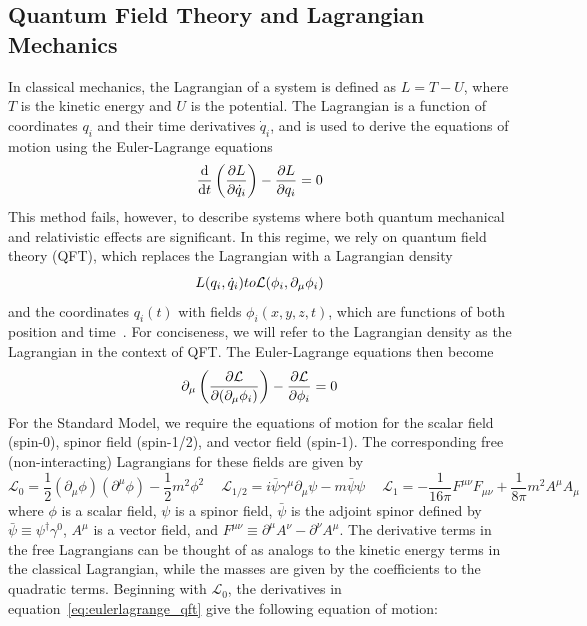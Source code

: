\subsection{Quantum Field Theory and Lagrangian Mechanics} \label{sec:sm_theory_qft}
In classical mechanics, the Lagrangian of a system is defined as $L=T-U$, where $T$ is the kinetic energy and $U$ is the potential. The Lagrangian is a function of coordinates $q_i$ and their time derivatives $\dot{q}_i$, and is used to derive the equations of motion using the Euler-Lagrange equations
\begin{equation}
	\label{eq:eulerlagrange_cm}
	\dv{}{t}\left(\pdv{L}{\dot{q}_i}\right)-\pdv{L}{q_i}=0
\end{equation}
This method fails, however, to describe systems where both quantum mechanical and relativistic effects are significant. In this regime, we rely on quantum field theory (QFT), which replaces the Lagrangian with a Lagrangian density
\begin{equation}
		L(q_i,\dot{q}_i)\to\mathcal{L}(\phi_i,\partial_\mu\phi_i)\\
\end{equation}
and the coordinates $q_i(t)$ with fields $\phi_i(x,y,z,t)$, which are functions of both position and time~\cite{Thomson_2013}. For conciseness, we will refer to the Lagrangian density as the Lagrangian in the context of QFT. The Euler-Lagrange equations then become
\begin{equation}
	\label{eq:eulerlagrange_qft}
	\partial_\mu\left(\pdv{\mathcal{L}}{(\partial_\mu\phi_i)}\right)-\pdv{\mathcal{L}}{\phi_i}=0
\end{equation}
For the Standard Model, we require the equations of motion for the scalar field (spin-0), spinor field (spin-1/2), and vector field (spin-1). The corresponding free (non-interacting) Lagrangians for these fields are given by
\begin{equation}\label{eq:lagrangians}
	\mathcal{L}_0=\frac{1}{2}\left(\partial_\mu\phi\right)\left(\partial^\mu\phi\right)-\frac{1}{2}m^2\phi^2\quad \ 
	\mathcal{L}_{1/2}=i\bar{\psi}\gamma^\mu\partial_\mu\psi-m\bar{\psi}\psi \quad \ 
	\mathcal{L}_{1}=-\frac{1}{16\pi}F^{\mu\nu}F_{\mu\nu}+\frac{1}{8\pi}m^2A^\mu A_\mu
\end{equation}
where $\phi$ is a scalar field, $\psi$ is a spinor field, $\bar{\psi}$ is the adjoint spinor defined by $\bar{\psi}\equiv\psi^\dagger\gamma^0$, $A^\mu$ is a vector field, and $F^{\mu\nu}\equiv\partial^\mu A^\nu-\partial^\nu A^\mu$. The derivative terms in the free Lagrangians can be thought of as analogs to the kinetic energy terms in the classical Lagrangian, while the masses are given by the coefficients to the quadratic terms. Beginning with $\mathcal{L}_0$, the derivatives in equation~\ref{eq:eulerlagrange_qft} give the following equation of motion:
